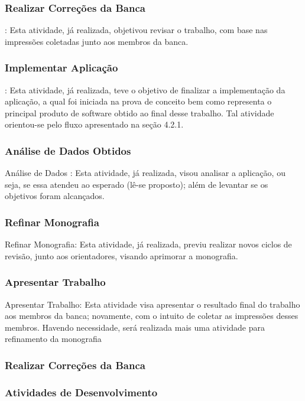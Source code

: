 \subsubsection{Realizar Correções da Banca}
: Esta atividade, já realizada, objetivou revisar o
trabalho, com base nas impressões coletadas junto aos membros da banca.

\subsubsection{Implementar Aplicação}
: Esta atividade, já realizada, teve o objetivo de finalizar a implementação da aplicação, a qual foi iniciada na prova de conceito bem como
representa o principal produto de software obtido ao final desse trabalho. Tal atividade
orientou-se pelo fluxo apresentado na seção 4.2.1.

\subsubsection{Análise de Dados Obtidos}
Análise de Dados : Esta atividade, já realizada, visou analisar a aplicação, ou seja, se essa atendeu ao esperado (lê-se proposto); além de levantar se os objetivos
foram alcançados.

\subsubsection{Refinar Monografia}
Refinar Monografia: Esta atividade, já realizada, previu realizar novos ciclos de
revisão, junto aos orientadores, visando aprimorar a monografia.

\subsubsection{Apresentar Trabalho}
Apresentar Trabalho: Esta atividade visa apresentar o resultado final do trabalho aos membros da banca; novamente, com o intuito de coletar as impressões desses
membros. Havendo necessidade, será realizada mais uma atividade para refinamento da
monografia

\subsubsection{Realizar Correções da Banca}


\subsubsection{Atividades de Desenvolvimento}

